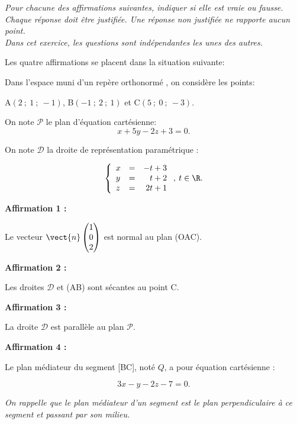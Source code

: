 \medskip

\emph{Pour chacune des affirmations suivantes, indiquer si elle est vraie ou fausse.\\
Chaque réponse doit être justifiée. Une réponse non justifiée ne rapporte aucun point.\\
Dans cet exercice, les questions sont indépendantes les unes des autres.}

\medskip

Les quatre affirmations se placent dans la situation suivante:

Dans l'espace muni d'un repère orthonormé \Oijk, on considère les points: 
\begin{center}A$(2~;~1~;~-1)$, \quad B$(-1~;~2~;~1)$ et \quad C$(5~;~0~;~-3)$.\end{center}

On note $\mathcal{P}$ le plan d'équation cartésienne:
\[x + 5y - 2z + 3 = 0.\]

On note $\mathcal{D}$ la droite de représentation paramétrique :

\[\left\{\begin{array}{l c r}
x&=&-t +3\\
y&=&t+ 2\\
z &=& 2t +1
\end{array}\right., \: t \in \R.\]

\medskip

\textbf{Affirmation 1 :}

Le vecteur $\vect{n}\begin{pmatrix}1\\0\\2\end{pmatrix}$ est normal au plan (OAC).

\medskip

\textbf{Affirmation 2 :}

Les droites $\mathcal{D}$ et (AB) sont sécantes au point C.

\medskip

\textbf{Affirmation 3 :}

La droite $\mathcal{D}$ est parallèle au plan $\mathcal{P}$.

\medskip

\textbf{Affirmation 4 :}

Le plan médiateur du segment [BC], noté $Q$, a pour équation cartésienne :

\[3x - y - 2z - 7 = 0.\]

\emph{On rappelle que le plan médiateur d'un segment est le plan perpendiculaire à ce segment et passant par son milieu.}

\bigskip
